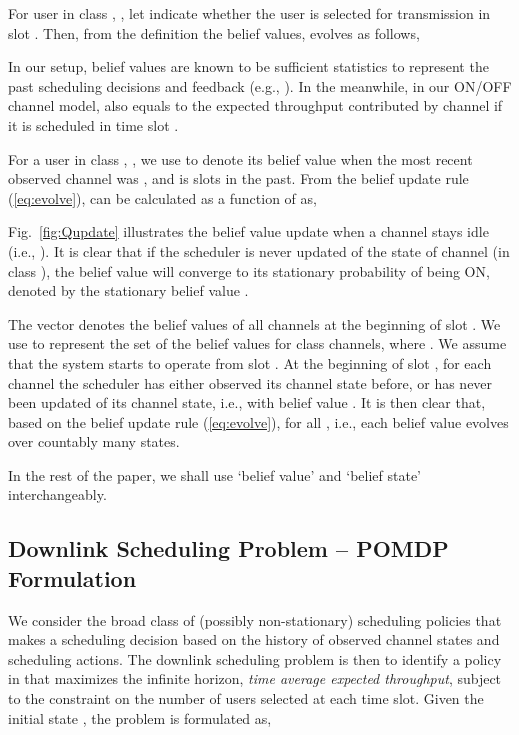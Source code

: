 \documentclass[11pt,twocolumn]{IEEEtran}
\begin{document}
For user  in class , , let  indicate whether the user is selected for transmission in slot . Then, from the definition the belief values,  evolves as follows,



In our setup, belief values are known to be sufficient statistics to represent the past scheduling decisions and feedback (e.g., \cite{Javidi,Sondik_thesis}). In the meanwhile, in our ON/OFF channel model,  also equals to the expected throughput contributed by channel  if it is scheduled in time slot .

For a user in class , , we use  to denote its
belief value when the most recent observed channel was
, and is  slots in the past. From the belief
update rule (\ref{eq:evolve}),  can be calculated as a
function of  as,


Fig.~\ref{fig:Qupdate} illustrates the belief value update when a channel stays idle
(i.e., ). It is clear
that if the scheduler is never updated of the state of channel 
(in class ), the belief value will converge to its stationary
probability of being ON, denoted by the stationary belief value
.

The vector  denotes the belief values of all channels at the beginning of slot . We use  to represent the set of the belief values for class  channels, where . We assume that the system starts to operate from slot . At the beginning of slot , for each channel the scheduler has either observed its channel state before, or has never been updated of its channel state, i.e., with belief value . It is then clear that, based on the belief update rule (\ref{eq:evolve}),  for all , i.e., each belief value  evolves over countably many states.


In the rest of the paper, we shall use `belief value' and `belief state' interchangeably.

\subsection{Downlink Scheduling Problem -- POMDP Formulation}
We consider the broad class  of (possibly non-stationary) scheduling policies that makes a scheduling decision based on the history of observed channel states and scheduling actions.
The downlink scheduling problem is then to identify a policy in  that maximizes the infinite horizon, \emph{time average expected throughput}, subject to the constraint on the number of users selected at each time slot. Given the initial state , the problem is formulated as,
\end{document}
